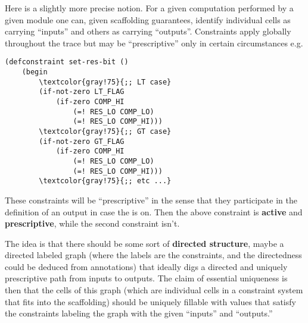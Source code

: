 Here is a slightly more precise notion. For a given computation performed by a given module one can, given scaffolding guarantees, identify individual cells as carrying ``inputs'' and others as carrying ``outputs''. Constraints apply globally throughout the trace but may be ``prescriptive'' only in certain circumstances e.g.
\begin{Verbatim}[commandchars=\\\{\}]
(defconstraint set-res-bit ()
	(begin
		\textcolor{gray!75}{;; LT case} 
		(if-not-zero LT_FLAG
			(if-zero COMP_HI 
				(=! RES_LO COMP_LO)
				(=! RES_LO COMP_HI)))
		\textcolor{gray!75}{;; GT case} 
		(if-not-zero GT_FLAG
			(if-zero COMP_HI 
				(=! RES_LO COMP_LO)
				(=! RES_LO COMP_HI)))
		\textcolor{gray!75}{;; etc ...} 
\end{Verbatim}
These constraints will be ``prescriptive'' in the sense that they participate in the definition of an output in case the  is on. Then the above constraint is \textbf{active} and \textbf{prescriptive}, while the second constraint isn't.

The idea is that there should be some sort of \textbf{directed structure}, maybe a directed labeled graph (where the labels are the constraints, and the directedness could be deduced from \corset{} annotations) that ideally digs a directed and uniquely prescriptive path from inputs to outputs. The claim of essential uniqueness is then that the cells of this graph (which are individual cells in a constraint system that fits into the scaffolding) should be uniquely fillable with values that satisfy the constraints labeling the graph with the given ``inputs'' and ``outputs.''
